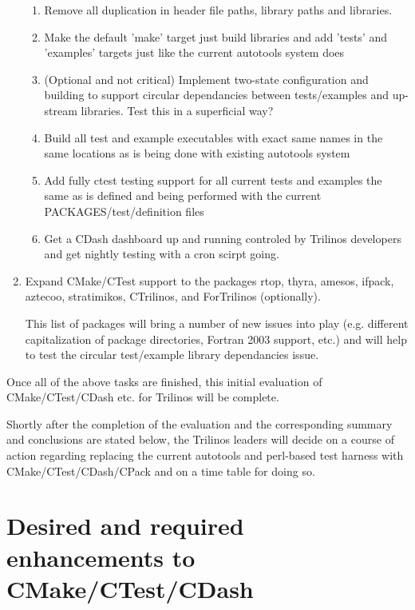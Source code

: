 \documentclass[pdf,ps2pdf,11pt]{SANDreport}
\begin{document}
\begin{enumerate}
  \begin{enumerate}
  \item Remove all duplication in header file paths, library paths and libraries.
  \item Make the default 'make' target just build libraries and add
    'tests' and 'examples' targets just like the current autotools system
    does
  \item (Optional and not critical) Implement two-state configuration and building to support circular
    dependancies between tests/examples and up-stream libraries.  Test this
    in a superficial way?
  \item Build all test and example executables with exact same names in the
    same locations as is being done with existing autotools system
  \item Add fully ctest testing support for all current tests and examples
    the same as is defined and being performed with the current
    PACKAGES/test/definition files
  \item Get a CDash dashboard up and running controled by Trilinos developers
    and get nightly testing with a cron scirpt going.
  \end{enumerate}

{}\item Expand CMake/CTest support to the packages rtop, thyra,
amesos, ifpack, aztecoo, stratimikos, CTrilinos, and ForTrilinos
(optionally).

This list of packages will bring a number of new issues into play
(e.g. different capitalization of package directories, Fortran 2003
support, etc.)  and will help to test the circular test/example
library dependancies issue.

\end{enumerate}

Once all of the above tasks are finished, this initial evaluation of
CMake/CTest/CDash etc. for Trilinos will be complete.

Shortly after the completion of the evaluation and the corresponding
summary and conclusions are stated below, the Trilinos leaders will
decide on a course of action regarding replacing the current autotools
and perl-based test harness with CMake/CTest/CDash/CPack and on a time
table for doing so.

%
\section{Desired and required enhancements to CMake/CTest/CDash}
%
\end{document}
